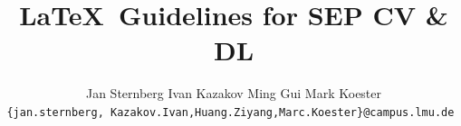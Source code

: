 \documentclass[10pt,twocolumn,letterpaper]{article}
\title{\LaTeX\ Guidelines for SEP CV \& DL}
\author{Jan Sternberg
\quad
Ivan Kazakov
\quad
Ming Gui
\quad
Mark Koester\\
\tt\small\{jan.sternberg, Kazakov.Ivan,Huang.Ziyang,Marc.Koester\}@campus.lmu.de
}
\begin{document}
\maketitle
    


{
    \small
    
    
}

% 
\end{document}
